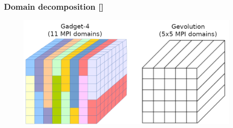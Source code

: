 \documentclass{beamer}
\makeatletter
\newcommand{\mylabel}{%
   [\beamer@againname]}
\makeatother
\begin{document}
\begin{frame}[label=meshdomains]
    \frametitle{Domain decomposition\mylabel}
    \begin{figure}
        \centering
        \includegraphics[width=.8\textwidth]{images/domains.png}
    \end{figure}
\end{frame}
\end{document}

